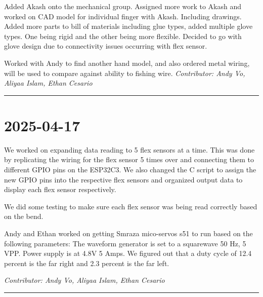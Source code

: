 \documentclass[12pt]{article}
\begin{document}
Added Akash onto the mechanical group. Assigned more work to Akash and worked on CAD model for individual finger with Akash. Including drawings.
Added more parts to bill of materials including glue types, added multiple glove types. One being rigid and the other being more flexible. Decided to go with glove design due to connectivity issues occurring with flex sensor.

Worked with Andy to find another hand model, and also ordered metal wiring, will be used to compare against ability to fishing wire.
\vspace{1em}
\noindent\textit{Contributor: Andy Vo, Aliyaa Islam, Ethan Cesario}
\vspace{1em}
\hrule

\section*{2025-04-17}
We worked on expanding data reading to 5 flex sensors at a time. This was done by replicating the wiring for the flex sensor 5 times over and connecting them to different GPIO pins on the ESP32C3. We also changed the C script to assign the new GPIO pins into the respective flex sensors and organized output data to display each flex sensor respectively.

We did some testing to make sure each flex sensor was being read correctly based on the bend.

Andy and Ethan worked on getting Smraza mico-servos s51 to run based on the following parameters:
The waveform generator is set to a squarewave 50 Hz, 5 VPP. Power supply is at 4.8V 5 Amps. We figured out that a duty cycle of 12.4 percent is the far right and 2.3 percent is the far left.



\vspace{1em}
\noindent\textit{Contributor: Andy Vo, Aliyaa Islam, Ethan Cesario}
\vspace{1em}
\hrule
\end{document}
